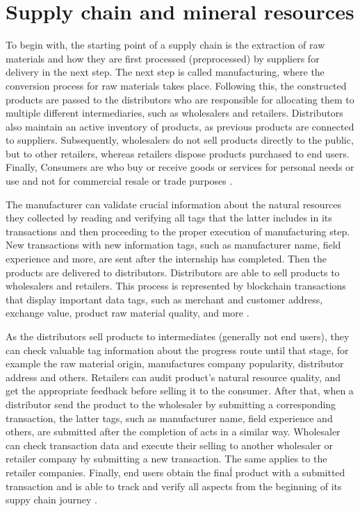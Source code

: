 \section{Supply chain and mineral resources}\label{sec:scmMineral}

To begin with, the starting point of a supply chain is the extraction of raw materials and how they are first processed (preprocessed) by suppliers for delivery in the next step. The next step is called manufacturing, where the conversion process for raw materials takes place. Following this, the constructed products are passed to the distributors who are responsible for allocating them to multiple different intermediaries, such as wholesalers and retailers. Distributors also maintain an active inventory of products, as previous products are connected to suppliers. Subsequently, wholesalers do not sell products directly to the public, but to other retailers, whereas retailers dispose products purchased to end users. Finally, Consumers are who buy or receive goods or services for personal needs or use and not for commercial resale or trade purposes \cite{litke2019blockchains}.

The manufacturer can validate crucial information about the natural resources they collected by reading and verifying all tags that the latter includes in its transactions and then proceeding to the proper execution of manufacturing step. New transactions with new information tags, such as manufacturer name, field experience and more, are sent after the internship has completed. Then the products are delivered to distributors. Distributors are able to sell products to wholesalers and retailers. This process is represented by blockchain transactions that display important data tags, such as merchant and customer address, exchange value, product raw material quality, and more \cite{sauer2018extending}. 

As the distributors sell products to intermediates (generally not end users), they can check valuable tag information about the progress route until that stage, for example the raw material origin, manufactures company popularity, distributor address and others. Retailers can audit product's natural resource quality, and get the appropriate feedback before selling it to the consumer. After that, when a distributor send the product to the wholesaler by submitting a corresponding transaction, the latter tags, such as manufacturer name, field experience and others, are submitted after the completion of acts in a similar way. Wholesaler can check transaction data and execute their selling to another wholesaler or retailer company by submitting a new transaction. The same applies to the retailer companies. Finally, end users obtain the finaĺ product with a submitted transaction and is able to track and verify all aspects from the beginning of its suppy chain journey \cite{litke2019blockchains}. 

